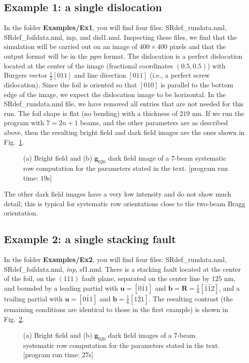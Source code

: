 \documentclass[11pt]{article}
\begin{document}
\subsection{Example 1: a single dislocation}
In the folder \textbf{Examples/Ex1}, you will find four files: \textsf{SRdef\_rundata.nml}, \textsf{SRdef\_foildata.nml}, \textsf{inp}, and \textsf{disl1.nml}.  Inspecting these files, we 
find that the simulation will be carried out on an image of $400\times 400$ pixels and that the output format will be in the \textit{pgm} format.  The dislocation is a perfect
dislocation located at the center of the image (fractional coordinates $(0.5,0.5)$) 
with Burgers vector $\frac{1}{2}[011]$ and line direction $[011]$ (i.e., a perfect screw dislocation). Since the foil is oriented so that $[010]$ is 
parallel to the bottom edge of the image, we expect the dislocation image to be horizontal.  In the \textsf{SRdef\_rundata.nml} file, we have removed all entries
that are not needed for this run.  The foil shape is flat (no bending) with a thickness of $219$ nm.  If we run the program with $7=2n+1$ beams, and the other 
parameters are as described above, then the resulting bright field and dark field images are the ones shown in Fig.~\ref{fig:disl}.

\begin{figure}[h]
\centering\leavevmode
{}
\caption{\label{fig:disl}(a) Bright field and (b) $\mathbf{g}_{020}$ dark field image of a $7$-beam systematic row computation for the parameters stated in the text.  [program run time:  $19$s]}
\end{figure}

The other dark field images have a very low intensity and do not show much detail; this is typical for systematic row
orientations close to the two-beam Bragg orientation.

\newpage
\subsection{Example 2: a single stacking fault}
In the folder \textbf{Examples/Ex2}, you will find four files: \textsf{SRdef\_rundata.nml}, \textsf{SRdef\_foildata.nml}, \textit{inp}, \textsf{sf1.nml}.  There is a stacking fault 
located at the center of the foil, on the $(111)$ fault plane, separated on the center line by $125$ nm, and bounded by a leading partial with $\mathbf{u}=[0\bar{1}1]$
and $\mathbf{b}=\mathbf{R}=\frac{1}{6}[\bar{1}\bar{1}2]$, and a trailing partial with $\mathbf{u}=[0\bar{1}1]$
and $\mathbf{b}=\frac{1}{6}[1\bar{2}1]$.  The resulting contrast (the remaining conditions are identical to those in the first example) is shown in
Fig.~\ref{fig:sf}.
\begin{figure}[ht]
\centering\leavevmode
{}
\caption{\label{fig:sf} (a) Bright field and (b) $\mathbf{g}_{020}$ dark field images of a $7$-beam systematic row computation for the parameters stated in the text.  [program run time: $27$s]}
\end{figure}
\end{document}
